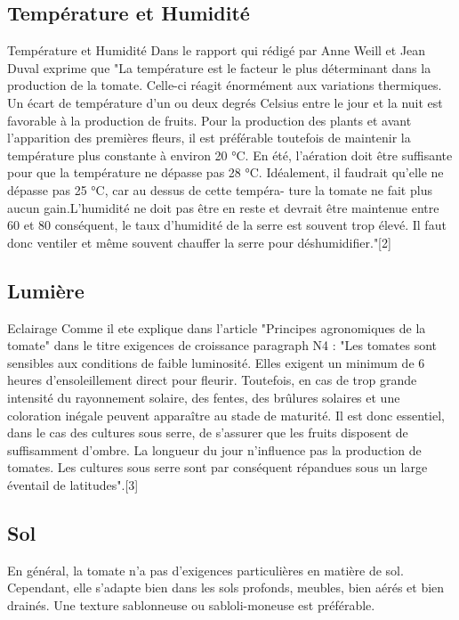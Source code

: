 \subsection{Température et Humidité}
Température et Humidité
Dans le rapport qui rédigé par Anne Weill et Jean Duval exprime que
"La température est le facteur le plus déterminant dans la production de la tomate. Celle-ci
réagit énormément aux variations thermiques.
Un écart de température d’un ou deux degrés Celsius entre le jour et la nuit est favorable à
la production de fruits. Pour la production des plants et avant l’apparition des premières
fleurs, il est préférable toutefois de maintenir la température plus constante à environ
20 °C. En été, l’aération doit être suffisante pour que la température ne dépasse pas 28
°C. Idéalement, il faudrait qu’elle ne dépasse pas 25 °C, car au dessus de cette tempéra-
ture la tomate ne fait plus aucun gain.L’humidité ne doit pas être en reste et devrait être
maintenue entre 60 et 80 %
conséquent, le taux d’humidité de la serre est souvent trop élevé. Il faut donc ventiler et
même souvent chauffer la serre pour déshumidifier."[2]

\subsection{Lumière}
Eclairage
Comme il ete explique dans l’article "Principes agronomiques de la tomate" dans le titre
exigences de croissance paragraph N4 : "Les tomates sont sensibles aux conditions de
faible luminosité. Elles exigent un minimum de 6 heures d’ensoleillement direct pour
fleurir. Toutefois, en cas de trop grande intensité du rayonnement solaire, des fentes, des
brûlures solaires et une coloration inégale peuvent apparaître au stade de maturité. Il est
donc essentiel, dans le cas des cultures sous serre, de s’assurer que les fruits disposent de
suffisamment d’ombre. La longueur du jour n’influence pas la production de tomates. Les
cultures sous serre sont par conséquent répandues sous un large éventail de latitudes".[3]
\subsection{Sol}
En général, la tomate n'a pas d'exigences particulières en matière de sol. Cependant, elle s'adapte bien dans les sols profonds, meubles, bien aérés et bien drainés. Une texture sablonneuse ou sabloli-moneuse est préférable.
